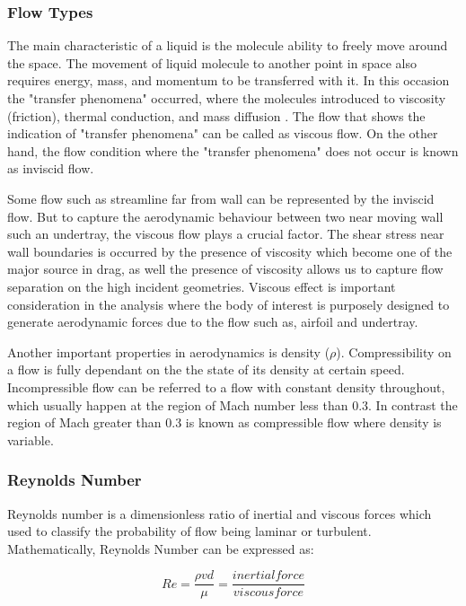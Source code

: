 \subsubsection{Flow Types}
The main characteristic of a liquid is the molecule ability to freely move around the space. The movement of liquid molecule to another point in space also requires energy, mass, and momentum to be transferred with it. In this occasion the "transfer phenomena" occurred, where the molecules introduced to viscosity (friction), thermal conduction, and mass diffusion \cite{Anderson2007FundamentalsJr.}. The flow that shows the indication of "transfer phenomena" can be called as viscous flow. On the other hand, the flow condition where the "transfer phenomena" does not occur is known as inviscid flow.

\noindent Some flow such as streamline far from wall can be represented by the inviscid flow. But to capture the aerodynamic behaviour between two near moving wall such an undertray, the viscous flow plays a crucial factor. The shear stress near wall boundaries is occurred by the presence of viscosity which become one of the major source in drag, as well the presence of viscosity allows us to capture flow separation on the high incident geometries. Viscous effect is important consideration in the analysis where the body of interest is purposely designed to generate aerodynamic forces due to the flow such as, airfoil and undertray.

\noindent Another important properties in aerodynamics is density ($\rho$). Compressibility on a flow is fully dependant on the the state of its density at certain speed. Incompressible flow can be referred to a flow with constant density throughout, which usually happen at the region of Mach number less than 0.3. In contrast the region of Mach greater than 0.3 is known as compressible flow where density is variable\cite{Anderson2007FundamentalsJr.}.

\subsubsection{Reynolds Number}
Reynolds number is a dimensionless ratio of inertial and viscous forces which used to classify the probability of flow being laminar or turbulent\cite{Rehm2008SituationalMPD}. Mathematically, Reynolds Number can be expressed as:

\begin{equation}
Re = \frac{\rho v d}{\mu} = \frac{inertial force}{viscous force}
\end{equation}

